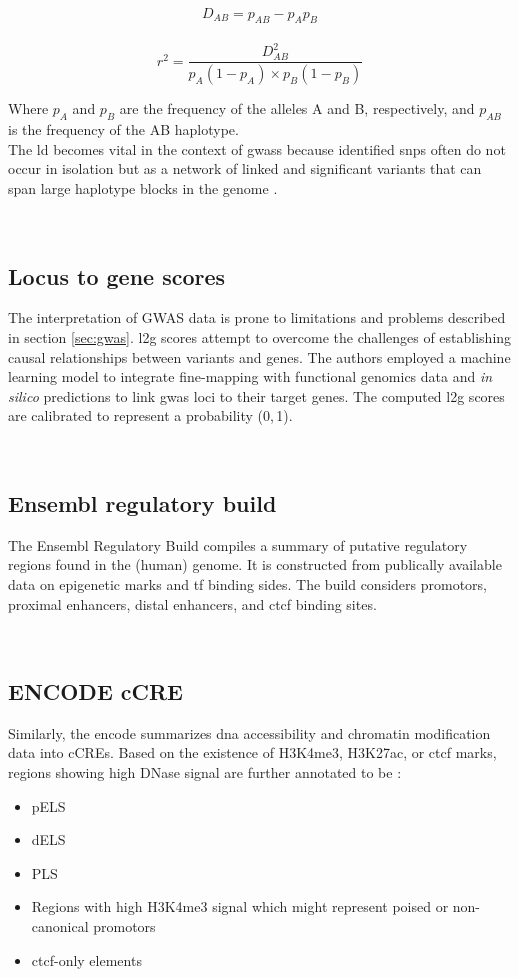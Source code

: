         $$ D_{AB} = p_{AB} − p_A p_B $$
        $$ r^2 = \frac{D_{AB}^2}{p_A (1-p_A) \times p_B (1-p_B)} $$

    Where $p_A$ and $p_B$ are the frequency of the alleles A and B, respectively, and $p_{AB}$ is the frequency of the AB haplotype.\\
    The \ac{ld} becomes vital in the context of \acp{gwas} because identified \acp{snp} often do not occur in isolation but as a network of linked and significant variants that can span large haplotype blocks in the genome \cite{slatkinLinkageDisequilibriumUnderstanding2008}.

    \subsection{Locus to gene scores}
    The interpretation of GWAS data is prone to limitations and problems described in section \ref{sec:gwas}. \Ac{l2g} scores attempt to overcome the challenges of establishing causal relationships between variants and genes. The authors employed a machine learning model to integrate fine-mapping with functional genomics data and \textit{in silico} predictions to link \ac{gwas} loci to their target genes. The computed \ac{l2g} scores are calibrated to represent a probability (0,\,1). \cite{mountjoyOpenApproachSystematically2021}

    \subsection{Ensembl regulatory build}
    The Ensembl Regulatory Build compiles a summary of putative regulatory regions found in the (human) genome. It is constructed from publically available data on epigenetic marks and \ac{tf} binding sides. The build considers promotors, proximal enhancers, distal enhancers, and \ac{ctcf} binding sites. \cite{zerbinoEnsemblRegulatoryBuild2015}

    \subsection{ENCODE \acs{cCRE}}
    Similarly, the \ac{encode} summarizes \ac{dna} accessibility and chromatin modification data into \acfp{cCRE}. Based on the existence of \ac{H3K4me3}, \ac{H3K27ac}, or \ac{ctcf} marks, regions showing high DNase signal are further annotated to be \cite{mooreExpandedEncyclopaediasDNA2020}:
    \begin{itemize}
        \item \ac{pELS}
        \item \ac{dELS}
        \item \ac{PLS}
        \item Regions with high \ac{H3K4me3} signal which might represent poised or non-canonical promotors
        \item \ac{ctcf}-only elements
    \end{itemize}

